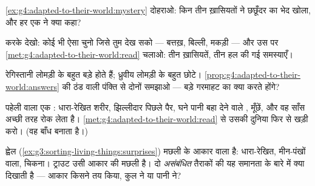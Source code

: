 \begin{exercise}[$\star$]\label{exo:g4:adapted-to-their-world:7}
\cref{ex:g4:adapted-to-their-world:mystery} दोहराओ: किन तीन ख़ासियतों
ने छछूँदर का भेद खोला, और हर एक ने क्या कहा?
\end{exercise}

\begin{exercise}[$\star$]\label{exo:g4:adapted-to-their-world:8}
करके देखो: कोई भी ऐसा  चुनो जिसे तुम देख सको --- बत्तख़, बिल्ली,
मकड़ी --- और उस पर \cref{met:g4:adapted-to-their-world:read} चलाओ: तीन
ख़ासियतें, तीन हल की गई समस्याएँ।
\end{exercise}

\begin{exercise}[$\star\star$]\label{exo:g4:adapted-to-their-world:9}
रेगिस्तानी लोमड़ी के  बहुत बड़े होते हैं; ध्रुवीय लोमड़ी के बहुत
छोटे। \cref{prop:g4:adapted-to-their-world:answers} की ठंड वाली पंक्ति
से दोनों समझाओ --- बड़े  गरमाहट का क्या करते होंगे?
\end{exercise}

\begin{exercise}[$\star\star$]\label{exo:g4:adapted-to-their-world:10}
पहेली वाला एक : धारा-रेखित शरीर, झिल्लीदार पिछले पैर, घने पानी बहा
देने वाले , मूँछें, और वह साँस अच्छी तरह रोक लेता है।
\cref{met:g4:adapted-to-their-world:read} से उसकी दुनिया फिर से खड़ी
करो। (वह बाँध बनाता है।)
\end{exercise}

\begin{exercise}[$\star\star\star$]\label{exo:g4:adapted-to-their-world:11}
ह्वेल (\cref{ex:g3:sorting-living-things:surprises}) मछली के आकार वाला
 है: धारा-रेखित, मीन-पंखों वाला, चिकना। ट्राउट उसी आकार की
मछली है। दो \emph{असंबंधित} तैराकों की यह समानता  के बारे में
क्या दिखाती है --- आकार किसने तय किया, कुल ने या पानी ने?
\end{exercise}
